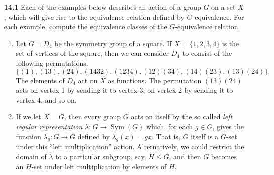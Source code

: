 \documentclass[12pt,reqno]{amsart}
\newcommand{\<}{\ensuremath{\langle}}
\renewcommand{\>}{\ensuremath{\rangle}}
\newcommand{\Sym}{\ensuremath{\operatorname{Sym}}}
\begin{document}
\begin{enumerate}
\item[{\bf 14.1}] Each of the examples below describes an action of a group $G$
  on a set $X$, which will give rise to the equivalence relation defined by
  $G$-equivalence.  For each example, compute the equivalence classes of the
  $G$-equivalence relation.  
 
\begin{enumerate}
\item
Let $G = D_4$ be the symmetry group of a square.  If $X = \{ 1, 2, 3, 4 \}$ is the set of vertices of the square, then we can consider $D_4$
to consist of the following permutations: 
\[
\{ (1), (13), (24), (1432), (1234), (12)(34), (14)(23), (13)(24) \}.
\]
The elements of $D_4$ act on $X$ as functions.  The permutation $(13)(24)$ acts on vertex 1 by sending it to vertex 3, on vertex 2 by
sending it to vertex 4, and so on.
\mbox{\hspace{1in}}

 
\item 
If we let $X = G$, then every group $G$ acts on itself by the so called 
\emph{left regular representation} $\lambda: G \rightarrow \Sym(G)$ which, for
each $g\in G$, gives the function $\lambda_g: G\rightarrow G$ 
defined by $\lambda_g(x) = gx$. That is, $G$
itself is a $G$-set under this ``left multiplication'' action.
Alternatively, we could restrict the domain of $\lambda$ to a particular
subgroup, say, $H\leq G$, and then $G$ becomes an $H$-set under left 
multiplication by elements of $H$. 
 

\end{enumerate}
\end{enumerate}
\end{document}
